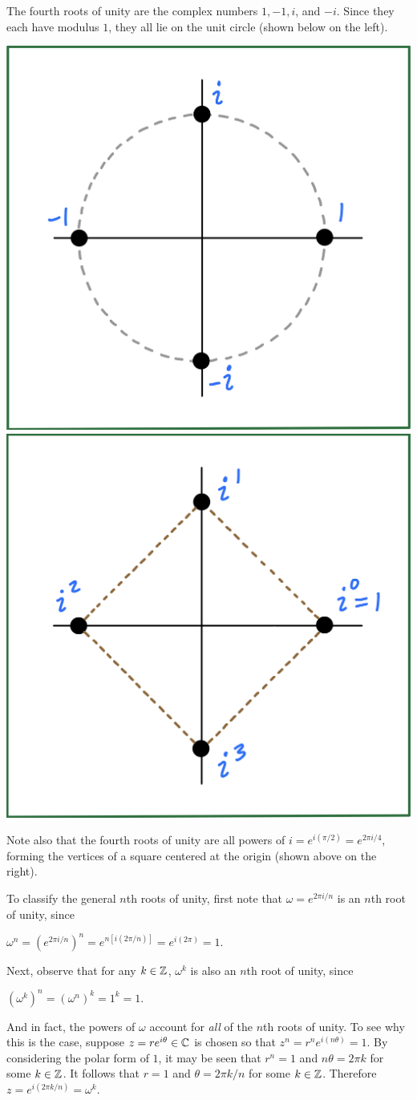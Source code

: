 \documentclass[11pt,fleqn,dvipsnames,usenames]{article}
\newcommand{\p}{\noindent}
\begin{document}
\begin{example}
The fourth roots of unity are the complex numbers $1, -1, i$, and $-i$.  Since they each have modulus $1$, they all lie on the unit circle (shown below on the left).
\end{example}
%
\begin{center}
\includegraphics[width=0.3\linewidth]{4throotsofunity}\hspace{4cm} \includegraphics[width=0.3\linewidth]{powersofi}
\end{center}
\vsmsp

\p Note also that the fourth roots of unity are all powers of $i = e^{i(\pi/2)} = e^{2\pi i/4}$, forming the vertices of a square centered at the origin (shown above on the right).
\vsp 

\GRAYLINE
\vsmsp

\p To classify the general $n$th roots of unity, first note that $\omega = e^{2\pi i/n}$ is an $n$th root of unity, since
\begin{center}
$\omega^{n} = \left(e^{2\pi i/n}\right)^{n} = e^{n[i(2\pi/n)]} = e^{i(2\pi)} = 1$.
\end{center}
\vsp

\p Next, observe that for any $k\in \mathbb{Z}$, $\omega^{k}$ is also an $n$th root of unity, since
\begin{center}
$\left(\omega^{k}\right)^{n} = \left(\omega^{n}\right)^{k} = 1^{k} = 1$.
\end{center}

\p And in fact, the powers of $\omega$ account for \emph{all} of the $n$th roots of unity.  To see why this is the case, suppose $z = re^{i\theta}\in\mathbb{C}$ is chosen so that $z^n = r^ne^{i(n\theta)} = 1$.  By considering the polar form of $1$, it may be seen that $r^{n} = 1$ and $n\theta = 2\pi k$ for some $k\in\mathbb{Z}$.  It follows that $r = 1$ and $\theta = 2\pi k/n$ for some $k\in\mathbb{Z}$.  Therefore $z = e^{i(2\pi k/n)} = \omega^{k}$. 
\vsp
\end{document}
